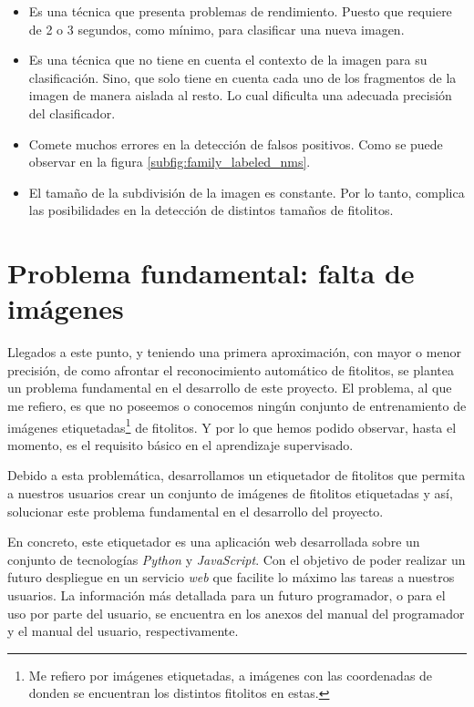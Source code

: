 \begin{itemize}
	\item Es una técnica que presenta problemas de rendimiento. Puesto que requiere de 2 o 3 segundos, como mínimo, para clasificar una nueva imagen.
	\item Es una técnica que no tiene en cuenta el contexto de la imagen para su clasificación. Sino, que solo tiene en cuenta cada uno de los fragmentos de la imagen de manera aislada al resto. Lo cual dificulta una adecuada precisión del clasificador.
	\item Comete muchos errores en la detección de falsos positivos. Como se puede observar en la figura \ref{subfig:family_labeled_nms}.
	\item El tamaño de la subdivisión de la imagen es constante. Por lo tanto, complica las posibilidades en la detección de distintos tamaños de fitolitos.
\end{itemize}

\section{Problema fundamental: falta de imágenes}

Llegados a este punto, y teniendo una primera aproximación, con mayor o menor precisión, de como afrontar el reconocimiento automático de fitolitos, se plantea un problema fundamental en el desarrollo de este proyecto. El problema, al que me refiero, es que no poseemos o conocemos ningún conjunto de entrenamiento de imágenes etiquetadas\footnote{Me refiero por imágenes etiquetadas, a imágenes con las coordenadas de donden se encuentran los distintos fitolitos en estas.} de fitolitos. Y por lo que hemos podido observar, hasta el momento, es el requisito básico en el aprendizaje supervisado.

Debido a esta problemática, desarrollamos un etiquetador de fitolitos que permita a nuestros usuarios crear un conjunto de imágenes de fitolitos etiquetadas y así, solucionar este problema fundamental en el desarrollo del proyecto.

En concreto, este etiquetador es una aplicación web desarrollada sobre un conjunto de tecnologías \textit{Python} y \textit{JavaScript}. Con el objetivo de poder realizar un futuro despliegue en un servicio \textit{web} que facilite lo máximo las tareas a nuestros usuarios. La información más detallada para un futuro programador, o para el uso por parte del usuario, se encuentra en los anexos del manual del programador y el manual del usuario, respectivamente.

